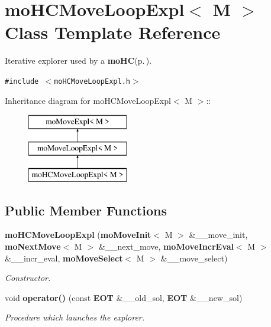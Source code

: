 \section{mo\-HCMove\-Loop\-Expl$<$ M $>$ Class Template Reference}
\label{classmo_h_c_move_loop_expl}
Iterative explorer used by a {\bf mo\-HC}{\rm (p.\,\pageref{classmo_h_c})}.  


{\tt \#include $<$mo\-HCMove\-Loop\-Expl.h$>$}

Inheritance diagram for mo\-HCMove\-Loop\-Expl$<$ M $>$::\begin{figure}[H]
\begin{center}
\leavevmode
\includegraphics[height=3cm]{classmo_h_c_move_loop_expl}
\end{center}
\end{figure}
\subsection*{Public Member Functions}
\begin{CompactItemize}
\item 
{\bf mo\-HCMove\-Loop\-Expl} ({\bf mo\-Move\-Init}$<$ M $>$ \&\_\-\_\-move\_\-init, {\bf mo\-Next\-Move}$<$ M $>$ \&\_\-\_\-next\_\-move, {\bf mo\-Move\-Incr\-Eval}$<$ M $>$ \&\_\-\_\-incr\_\-eval, {\bf mo\-Move\-Select}$<$ M $>$ \&\_\-\_\-move\_\-select)
\begin{CompactList}\small\item\em Constructor. \item\end{CompactList}\item 
void {\bf operator()} (const {\bf EOT} \&\_\-\_\-old\_\-sol, {\bf EOT} \&\_\-\_\-new\_\-sol)
\begin{CompactList}\small\item\em Procedure which launches the explorer. \item\end{CompactList}\end{CompactItemize}
